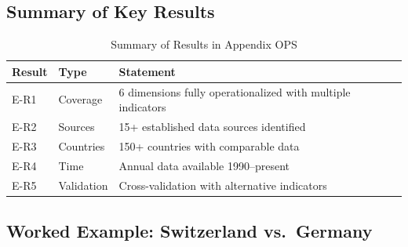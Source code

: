 \subsection{Summary of Key Results}
\label{sec:E-results}

\begin{table}[htbp]
\centering
\caption{Summary of Results in Appendix OPS}
\label{tab:E-results}
\renewcommand{\arraystretch}{1.2}
\begin{tabular}{@{}llp{7cm}@{}}
\toprule
\textbf{Result} & \textbf{Type} & \textbf{Statement} \\
\midrule
E-R1 & Coverage & 6 dimensions fully operationalized with multiple indicators \\
E-R2 & Sources & 15+ established data sources identified \\
E-R3 & Countries & 150+ countries with comparable data \\
E-R4 & Time & Annual data available 1990--present \\
E-R5 & Validation & Cross-validation with alternative indicators \\
\bottomrule
\end{tabular}
\end{table}


\subsection{Worked Example: Switzerland vs.\ Germany}
\label{sec:E-example}

